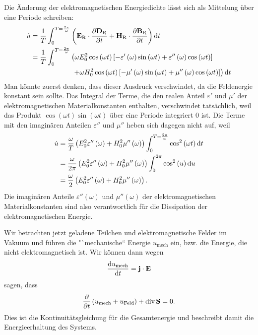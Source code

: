 Die Änderung der elektromagnetischen Energiedichte lässt sich als Mittelung über eine Periode schreiben:
\begin{align*}
	\dot{u} & =\frac{1}{T}\int _{0}^{T=\frac{2\pi }{\omega }}\left(\mathbf{E}_{\mathrm{R}}\cdot \frac{\partial \mathbf{D}_{\mathrm{R}}}{\partial t}+\mathbf{H}_{\mathrm{R}}\cdot \frac{\partial \mathbf{B}_{\mathrm{R}}}{\partial t}\right)\mathop{}\!\mathrm{d} t                  \\
	        & =\frac{1}{T}\int _{0}^{T=\frac{2\pi }{\omega }}\left(\omega E_{0}^{2}\cos \left(\omega t\right)\left[-\varepsilon '\left(\omega \right)\sin \left(\omega t\right)+\varepsilon ''\left(\omega \right)\cos \left(\omega t\right)\right] \right. \\
	        & \qquad\qquad\qquad \left. +\omega H_{0}^{2}\cos \left(\omega t\right)\left[-\mu '\left(\omega \right)\sin \left(\omega t\right)+\mu ''\left(\omega \right)\cos \left(\omega t\right)\right]\right)\mathop{}\!\mathrm{d} t
\end{align*}
Man könnte zuerst denken, dass dieser Ausdruck verschwindet, da die Feldenergie konstant sein sollte. Das Integral der Terme, die den realen Anteil $\varepsilon '$ und $\mu '$ der elektromagnetischen Materialkonstanten enthalten, verschwindet tatsächlich, weil das Produkt $\cos \left(\omega t\right)\sin \left(\omega t\right)$ über eine Periode integriert $0$ ist. Die Terme mit den imaginären Anteilen $\varepsilon ''$ und $\mu ''$ heben sich dagegen nicht auf, weil
\begin{align*}
	\dot{u} & =\frac{\omega }{T}\left(E_{0}^{2}\varepsilon ''\left(\omega \right)+H_{0}^{2}\mu ''\left(\omega \right)\right)\int _{0}^{T=\frac{2\pi }{\omega }}\cos ^{2} \left(\omega t\right)\mathop{}\!\mathrm{d} t \\
	        & =\frac{\omega }{2\pi }\left(E_{0}^{2}\varepsilon ''\left(\omega \right)+H_{0}^{2}\mu ''\left(\omega \right)\right)\int _{0}^{2\pi }\cos ^{2} \left(u\right)\mathop{}\!\mathrm{d} u                      \\
	        & =\frac{\omega }{2}\left(E_{0}^{2}\varepsilon ''\left(\omega \right)+H_{0}^{2}\mu ''\left(\omega \right)\right).
\end{align*}
Die imaginären Anteile $\varepsilon ''\left(\omega \right)$ und $\mu ''\left(\omega \right)$ der elektromagnetischen Materialkonstanten sind also verantwortlich für die Dissipation der elektromagnetischen Energie.

Wir betrachten jetzt geladene Teilchen und elektromagnetische Felder im Vakuum und führen die "`mechanische`` Energie $u_{\text{mech}}$ ein, bzw. die Energie, die nicht elektromagnetisch ist. Wir können dann wegen
\begin{equation*}
	\frac{\mathop{}\!\mathrm{d} u_{\text{mech}}}{\mathop{}\!\mathrm{d} t}=\mathbf{j}\cdot \mathbf{E}
\end{equation*}
sagen, dass
\begin{equation*}
	\frac{\partial }{\partial t}\left(u_{\text{mech}}+u_{\text{Feld}}\right)+\operatorname{div} \mathbf{S}=0.
\end{equation*}
Dies ist die Kontinuitätsgleichung für die Gesamtenergie und beschreibt damit die Energieerhaltung des Systems.

